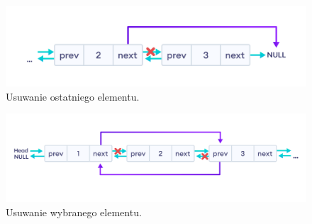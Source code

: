 \begin{figure}[!htb]
	\begin{center}
		\includegraphics[scale=0.6]{Dokumentacja/rys/usun_koniec.png}
		\caption{Usuwanie ostatniego elementu.}
		\label{rys:rysunek007}
	\end{center}
\end{figure}

\newpage


\begin{figure}[!htb]
	\begin{center}
		\includegraphics[scale=0.5]{Dokumentacja/rys/usun_srodek.png}
		\caption{Usuwanie wybranego elementu.}
		\label{rys:rysunek008}
	\end{center}
\end{figure}
